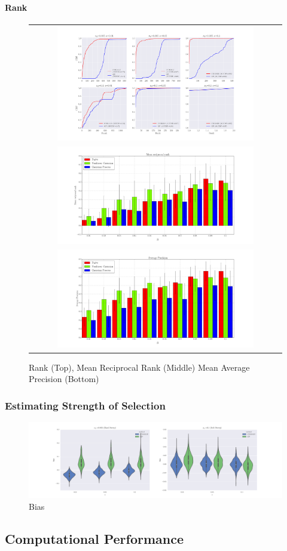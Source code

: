 \paragraph{Rank}
\begin{figure}[H]
  \centering
    \begin{tabular}{c}
        \includegraphics[width=0.8\textwidth]{rank}\\
  		    \includegraphics[width=0.8\textwidth]{mrr}\\
  		        \includegraphics[width=0.8\textwidth]{ap}
  \end{tabular}
  \caption{Rank (Top), Mean Reciprocal Rank (Middle) Mean Average Precision (Bottom)}
  \label{fig:rank}
\end{figure}



\subsubsection{Estimating Strength of Selection}
\begin{figure}[H]
  \centering
    \includegraphics[width=\textwidth]{bias}
  \caption{Bias}
  \label{fig:Fig4}
\end{figure}

\subsection{Computational Performance}